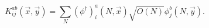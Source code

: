 \begin{equation}
K_{ij}^{ab} (\vec{x},\vec{y}) = \sum_{N} (\phi^{\dagger } )^{a}_{i}
(N,\vec{x}) \sqrt{O(N)} \phi^{b}_{j} (N,\vec{y}) .
\end{equation}

